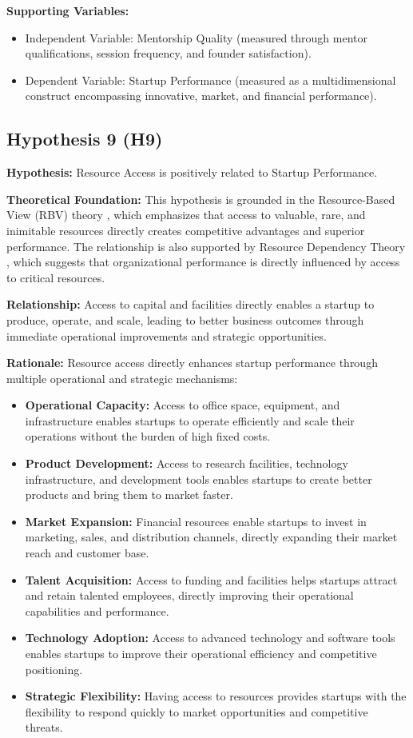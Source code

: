 \documentclass[../Main.tex]{subfiles}
\begin{document}
    \textbf{Supporting Variables:}
    \begin{itemize}
        \item Independent Variable: Mentorship Quality (measured through mentor qualifications, session frequency, and founder satisfaction).
        \item Dependent Variable: Startup Performance (measured as a multidimensional construct encompassing innovative, market, and financial performance).
    \end{itemize}

    \subsection{Hypothesis 9 (H9)}
    \textbf{Hypothesis:} Resource Access is positively related to Startup Performance.
    
    \textbf{Theoretical Foundation:} This hypothesis is grounded in the Resource-Based View (RBV) theory \cite{barney1991firm}, which emphasizes that access to valuable, rare, and inimitable resources directly creates competitive advantages and superior performance. The relationship is also supported by Resource Dependency Theory \cite{pfeffer1978external}, which suggests that organizational performance is directly influenced by access to critical resources.
    
    \textbf{Relationship:} Access to capital and facilities directly enables a startup to produce, operate, and scale, leading to better business outcomes through immediate operational improvements and strategic opportunities.
    
    \textbf{Rationale:} Resource access directly enhances startup performance through multiple operational and strategic mechanisms:
    \begin{itemize}
        \item \textbf{Operational Capacity:} Access to office space, equipment, and infrastructure enables startups to operate efficiently and scale their operations without the burden of high fixed costs.
        \item \textbf{Product Development:} Access to research facilities, technology infrastructure, and development tools enables startups to create better products and bring them to market faster.
        \item \textbf{Market Expansion:} Financial resources enable startups to invest in marketing, sales, and distribution channels, directly expanding their market reach and customer base.
        \item \textbf{Talent Acquisition:} Access to funding and facilities helps startups attract and retain talented employees, directly improving their operational capabilities and performance.
        \item \textbf{Technology Adoption:} Access to advanced technology and software tools enables startups to improve their operational efficiency and competitive positioning.
        \item \textbf{Strategic Flexibility:} Having access to resources provides startups with the flexibility to respond quickly to market opportunities and competitive threats.
    \end{itemize}
    
\end{document}
